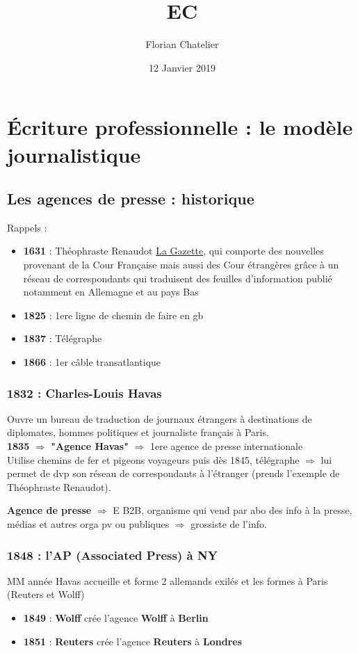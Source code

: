\documentclass[a4paper,11pt]{report}
\title{EC}
\author{Florian Chatelier}
\date{12 Janvier 2019}
\begin{document}
\part{Écriture professionnelle : le modèle journalistique}
\tableofcontents
\chapter{Les agences de presse : historique}


Rappels :
\begin{itemize}
    \item \textbf{1631} : Théophraste Renaudot \underline{La Gazette}, qui comporte des nouvelles provenant de la Cour Française mais aussi des Cour étrangères grâce à un réseau de correspondants qui traduisent des feuilles d’information publié notamment en Allemagne et au pays Bas
    \item \textbf{1825} : 1ere ligne de chemin de faire en gb
    \item \textbf{1837} : Télégraphe 
    \item \textbf{1866} : 1er câble transatlantique
\end{itemize}
\section{1832 : Charles-Louis Havas}
Ouvre un bureau de traduction de journaux étrangers à destinations de diplomates, hommes politiques et journaliste français à Paris. \\
\textbf{1835} $\Rightarrow$ \textbf{"Agence Havas"} $\Rightarrow$ 1ere agence de presse internationale \\

Utilise chemins de fer et pigeons voyageurs puis dès 1845, télégraphe $\Rightarrow$ lui permet de dvp son réseau de correspondants à l’étranger (prends l’exemple de Théophraste Renaudot).

\textbf{Agence de presse} $\Rightarrow$ E B2B, organisme qui vend par abo des info à la presse, médias et autres orga pv ou publiques $\Rightarrow$ grossiste de l’info.
\section{1848 : l’AP (Associated Press) à NY}

MM année Havas accueille et forme 2 allemands exilés et les formes à Paris (Reuters et Wolff)
\begin{itemize}
    \item \textbf{1849} : \textbf{Wolff} crée l’agence \textbf{Wolff} à \textbf{Berlin}
    \item \textbf{1851} : \textbf{Reuters} crée l’agence \textbf{Reuters} à \textbf{Londres}
\end{itemize}
\end{document}
